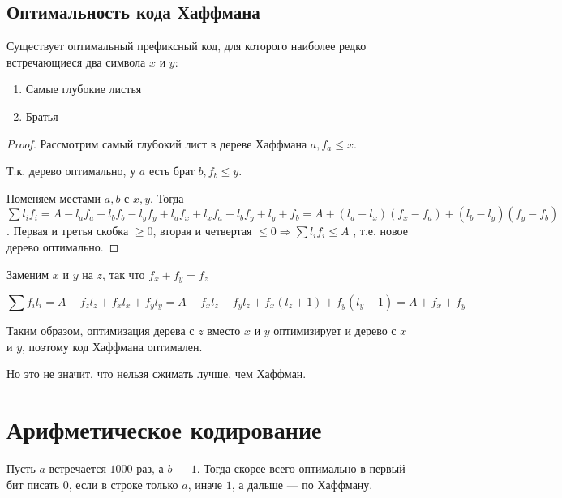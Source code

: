 

\cfoot{}

\usepackage{empheq}
\usepackage{xcolor}



\subsection{Оптимальность кода Хаффмана}

\begin{lemma}
    Существует оптимальный префиксный код, для которого наиболее редко встречающиеся два символа $x$ и $y$:
    \begin{enumerate}
        \item Самые глубокие листья
        \item Братья
    \end{enumerate}
\end{lemma}
\begin{proof}
    Рассмотрим самый глубокий лист в дереве Хаффмана $a, f_a\leq x$.

    Т.к. дерево оптимально, у $a$ есть брат $b, f_b\leq y$.

    \noindent
    Поменяем местами $a, b$ с $x, y$. Тогда $\sum l_i f_i=A-l_af_a-l_bf_b-l_yf_y+l_af_x+l_xf_a+l_bf_y+l_y+f_b = A + (l_a-l_x)(f_x-f_a) + (l_b-l_y)(f_y-f_b)$. Первая и третья скобка $\geq 0$, вторая и четвертая $\leq 0 \Rightarrow \sum l_i f_i\leq A$ , т.е. новое дерево оптимально.
\end{proof}

Заменим $x$ и $y$ на $z$, так что $f_x+f_y=f_z$

$$\sum f_il_i=A-f_zl_z+f_xl_x+f_yl_y=A-f_xl_z-f_yl_z+f_x(l_z+1)+f_y(l_y+1)=A+f_x+f_y$$

Таким образом, оптимизация дерева с $z$ вместо $x$ и $y$ оптимизирует и дерево с $x$ и $y$, поэтому код Хаффмана оптимален.

Но это не значит, что нельзя сжимать лучше, чем Хаффман.

\section{Арифметическое кодирование}

Пусть $a$ встречается $1000$ раз, а $b$ --- $1$. Тогда скорее всего оптимально в первый бит писать $0$, если в строке только $a$, иначе $1$, а дальше --- по Хаффману.

